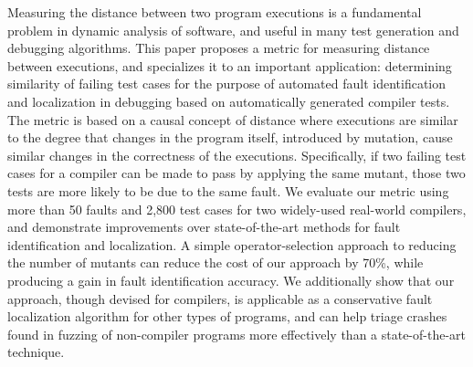Measuring the distance between two program executions is a fundamental problem in dynamic analysis of software, and useful in many test generation and debugging algorithms.  This paper proposes a metric for measuring distance between executions, and specializes it to an important application: determining similarity of failing test cases for the purpose of automated fault identification and localization in debugging based on automatically generated compiler tests.  The metric is based on a causal concept of distance where executions are similar to the degree that changes in the program itself, introduced by mutation, cause similar changes in the correctness of the executions.  Specifically, if two failing test cases for a compiler can be made to pass by applying the same mutant, those two tests are more likely to be due to the same fault.  We evaluate our metric using more than 50 faults and 2,800 test cases for two widely-used real-world compilers, and demonstrate improvements over state-of-the-art methods for fault identification and localization.  A simple operator-selection approach to reducing the number of mutants can reduce the cost of our approach by 70\%, while producing a gain in fault identification accuracy.  We additionally show that our approach, though devised for compilers, is applicable as a conservative fault localization algorithm for other types of programs, and can help triage crashes found in fuzzing of non-compiler programs more effectively than a state-of-the-art technique.